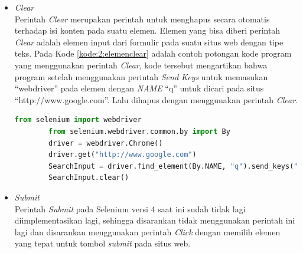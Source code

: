 \begin{itemize}
	\item \textit{Clear}\\
	Perintah \textit{Clear} merupakan perintah untuk menghapus secara otomatis terhadap isi konten pada suatu elemen. Elemen yang bisa diberi perintah \textit{Clear} adalah elemen input dari formulir pada suatu situs web dengan tipe teks. Pada Kode \ref{kode:2:elemenclear} adalah contoh potongan kode program yang menggunakan perintah \textit{Clear}, kode tersebut mengartikan bahwa program setelah menggunakan perintah \textit{Send Keys} untuk memasukan ``webdriver'' pada elemen dengan \textit{NAME} ``q'' untuk dicari pada situs ``http://www.google.com''. Lalu dihapus dengan menggunakan perintah \textit{Clear}.
	\begin{lstlisting}[language=python, caption=Contoh Potongan Kode Perintah \textit{Clear} pada Suatu Elemen, label=kode:2:elemenclear]
		from selenium import webdriver
		from selenium.webdriver.common.by import By
		driver = webdriver.Chrome()
		driver.get("http://www.google.com")
		SearchInput = driver.find_element(By.NAME, "q").send_keys("webdriver")
		SearchInput.clear()
	\end{lstlisting}
	
	\item \textit{Submit}\\
	Perintah \textit{Submit} pada Selenium versi 4 saat ini sudah tidak lagi diimplementasikan lagi, sehingga disarankan tidak menggunakan perintah ini lagi dan disarankan menggunakan perintah \textit{Click} dengan memilih elemen yang tepat untuk tombol \textit{submit} pada situs web.
	
\end{itemize}

